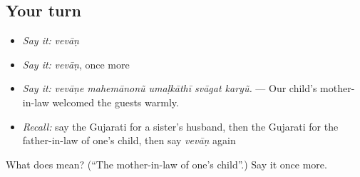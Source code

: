\subsection*{Your turn}
\begin{itemize}
\raggedright
  \item \emph{Say it:} \emph{vevāṇ}
  \item \emph{Say it:} \emph{vevāṇ}, once more
  \item \emph{Say it:} \emph{vevāṇe mahemānonũ umaḷkāthī svāgat karyũ.} — Our child's mother-in-law welcomed the guests warmly.
  \item \emph{Recall:} say the Gujarati for a sister's husband, then the Gujarati for the father-in-law of one's child, then say \emph{vevāṇ} again
\end{itemize}

\begin{tcolorbox}[breakable,colback=teal!4,colframe=teal!35!black,title={Before you move on}]
What does  mean? (\textquotedblleft{}The mother-in-law of one's child\textquotedblright{}.) Say it once more.
\end{tcolorbox}
